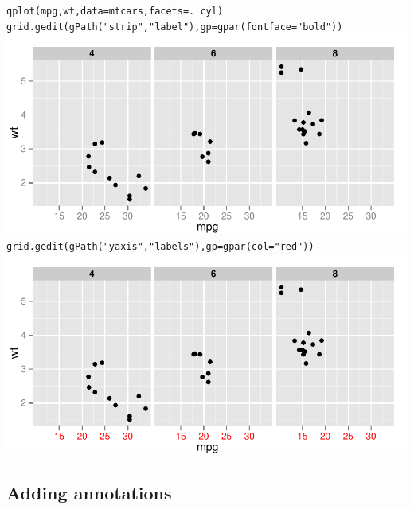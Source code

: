 \begin{alltt}
qplot(mpg, wt, data=mtcars, facets = . ~ cyl)
grid.gedit(gPath("strip","label"), gp=gpar(fontface="bold"))
\includegraphics[scale=0.5]{grid3}
grid.gedit(gPath("yaxis", "labels"), gp=gpar(col="red"))
\includegraphics[scale=0.5]{grid4}
\end{alltt}

% 
% 


\subsection{Adding annotations}\label{sec:adding_annotation}

